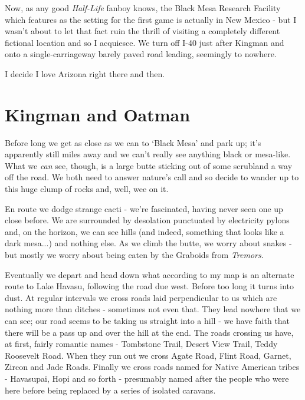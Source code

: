 \documentclass[a5paper,titlepage,11pt]{book}
\begin{document}
Now, as any good \emph{Half-Life} fanboy knows, the Black Mesa Research Facility which features as the setting for the first game is actually in New Mexico - but I wasn't about to let that fact ruin the thrill of visiting a completely different fictional location and so I acquiesce.  We turn off I-40 just after Kingman and onto a single-carriageway barely paved road leading, seemingly to nowhere.

I decide I love Arizona right there and then.

\section*{Kingman and Oatman}

Before long we get as close as we can to `Black Mesa' and park up; it's apparently still miles away and we can't really see anything black or mesa-like.  What we \emph{can} see, though, is a large butte sticking out of some scrubland a way off the road.  We both need to answer nature's call and so decide to wander up to this huge clump of rocks and, well, wee on it.


En route we dodge strange cacti - we're fascinated, having never seen one up close before.  We are surrounded by desolation punctuated by electricity pylons and, on the horizon, we can see hills (and indeed, something that looks like a dark mesa...) and nothing else.  As we climb the butte, we worry about snakes - but mostly we worry about being eaten by the Graboids from \emph{Tremors}.

Eventually we depart and head down what according to my map is an alternate route to Lake Havasu, following the road due west.  Before too long it turns into dust.  At regular intervals we cross roads laid perpendicular to us which are nothing more than ditches - sometimes not even that.  They lead nowhere that we can see; our road seems to be taking us straight into a hill - we have faith that there will be a pass up and over the hill at the end.  The roads crossing us have, at first, fairly romantic names - Tombstone Trail, Desert View Trail, Teddy Roosevelt Road.  When they run out we cross Agate Road, Flint Road, Garnet, Zircon and Jade Roads.  Finally we cross roads named for Native American tribes - Havasupai, Hopi and so forth - presumably named after the people who were here before being replaced by a series of isolated caravans.
\end{document}
